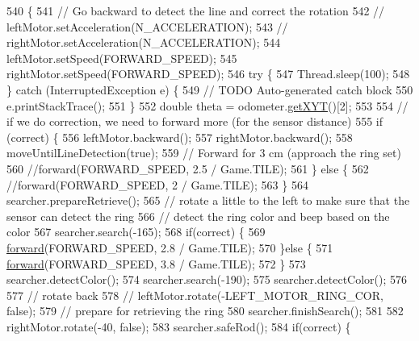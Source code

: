 \begin{DoxyCode}
540                                                                                    \{
541     \textcolor{comment}{// Go backward to detect the line and correct the rotation}
542     \textcolor{comment}{// leftMotor.setAcceleration(N\_ACCELERATION);}
543     \textcolor{comment}{// rightMotor.setAcceleration(N\_ACCELERATION);}
544     leftMotor.setSpeed(FORWARD\_SPEED);
545     rightMotor.setSpeed(FORWARD\_SPEED);
546     \textcolor{keywordflow}{try} \{
547       Thread.sleep(100);
548     \} \textcolor{keywordflow}{catch} (InterruptedException e) \{
549       \textcolor{comment}{// TODO Auto-generated catch block}
550       e.printStackTrace();
551     \}
552     \textcolor{keywordtype}{double} theta = odometer.\hyperlink{classca_1_1mcgill_1_1ecse211_1_1odometer_1_1_odometer_data_a8f40f0264c68f0cbed4fff1723ae7863}{getXYT}()[2];
553 
554     \textcolor{comment}{// if we do correction, we need to forward more (for the sensor distance)}
555     \textcolor{keywordflow}{if} (correct) \{
556       leftMotor.backward();
557       rightMotor.backward();
558       moveUntilLineDetection(\textcolor{keyword}{true});
559       \textcolor{comment}{// Forward for 3 cm (approach the ring set)}
560       \textcolor{comment}{//forward(FORWARD\_SPEED, 2.5 / Game.TILE);}
561     \} \textcolor{keywordflow}{else} \{
562       \textcolor{comment}{//forward(FORWARD\_SPEED, 2 / Game.TILE);}
563     \}
564     searcher.prepareRetrieve();
565     \textcolor{comment}{// rotate a little to the left to make sure that the sensor can detect the ring}
566     \textcolor{comment}{// detect the ring color and beep based on the color}
567     searcher.search(-165);
568     \textcolor{keywordflow}{if}(correct) \{
569       \hyperlink{classca_1_1mcgill_1_1ecse211_1_1project_1_1_navigation_a7c66610c5b7496ddb35d342ab2cd3f08}{forward}(FORWARD\_SPEED, 2.8 / Game.TILE);
570     \}\textcolor{keywordflow}{else} \{
571       \hyperlink{classca_1_1mcgill_1_1ecse211_1_1project_1_1_navigation_a7c66610c5b7496ddb35d342ab2cd3f08}{forward}(FORWARD\_SPEED, 3.8 / Game.TILE);
572     \}
573     searcher.detectColor();
574     searcher.search(-190);
575     searcher.detectColor();
576     
577     \textcolor{comment}{// rotate back}
578    \textcolor{comment}{// leftMotor.rotate(-LEFT\_MOTOR\_RING\_COR, false);}
579     \textcolor{comment}{// prepare for retrieving the ring}
580     searcher.finishSearch();
581     
582     rightMotor.rotate(-40, \textcolor{keyword}{false});
583     searcher.safeRod();
584     \textcolor{keywordflow}{if}(correct) \{

\end{DoxyCode}
